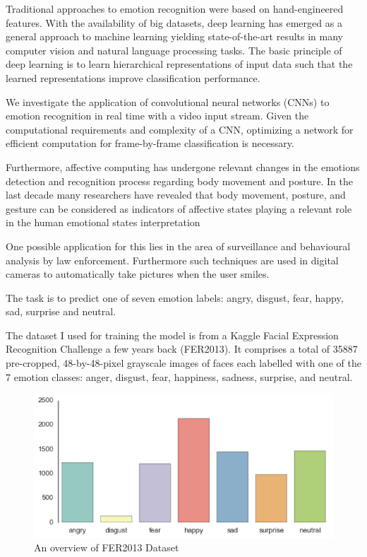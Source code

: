 Traditional approaches to emotion recognition were based on hand-engineered features. With the availability of big datasets, deep learning has emerged as a general approach to machine learning yielding state-of-the-art results in many computer vision and natural language processing tasks. The basic principle of deep learning is to learn hierarchical representations of input data such that the learned representations improve classification performance. 

We investigate the application of convolutional neural networks (CNNs) to emotion recognition in real time with a video input stream. Given the computational requirements and complexity of a CNN, optimizing a network for efficient computation for frame-by-frame classification is necessary.

Furthermore, affective computing has undergone relevant changes in the emotions detection and recognition process regarding body movement and posture. In the last decade many researchers have revealed that body movement, posture, and gesture can be considered as indicators of affective states playing a relevant role in the human emotional states interpretation

One possible application for this lies in the area of surveillance and behavioural analysis by law enforcement. Furthermore such techniques are used in digital cameras to automatically take pictures when the user smiles.

The task is to predict one of seven emotion labels: angry, disgust, fear, happy, sad, surprise and neutral.

The dataset I used for training the model is from a Kaggle Facial Expression Recognition Challenge a few years back (FER2013). It comprises a total of 35887 pre-cropped, 48-by-48-pixel grayscale images of faces each labelled with one of the 7 emotion classes: anger, disgust, fear, happiness, sadness, surprise, and neutral.

\begin{figure}[h]
	\centering\includegraphics{images/fer2013.png}
	\caption{An overview of FER2013 Dataset}
\end{figure}

